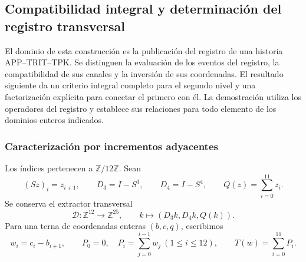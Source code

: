 \subsection{Compatibilidad integral y determinación del registro transversal}
\label{x_reciprocidad:img09:seccion}

El dominio de esta construcción es la publicación del registro de una
historia APP--TRIT--TPK. Se distinguen la evaluación de los eventos del
registro, la compatibilidad de sus canales y la inversión de sus
coordenadas. El resultado siguiente da un criterio integral completo para
el segundo nivel y una factorización explícita para conectar el primero con él.
La demostración utiliza los operadores del registro y establece sus
relaciones para todo elemento de los dominios enteros indicados.

\subsubsection{Caracterización por incrementos adyacentes}

Los índices pertenecen a $\mathbb Z/12\mathbb Z$. Sean
\[
 (Sz)_i=z_{i+1},\qquad D_3=I-S^3,\qquad D_4=I-S^4,
 \qquad Q(z)=\sum_{i=0}^{11}z_i.
\]
Se conserva el extractor transversal
\[
 \mathcal D:\mathbb Z^{12}\longrightarrow\mathbb Z^{25},
 \qquad k\longmapsto(D_3k,D_4k,Q(k)).
\]
Para una terna de coordenadas enteras $(b,c,q)$, escribimos
\begin{equation}
 w_i=c_i-b_{i+1},\qquad
 P_0=0,\quad P_i=\sum_{j=0}^{i-1}w_j\ (1\leq i\leq12),
 \qquad T(w)=\sum_{i=0}^{11}P_i.
 \label{x_reciprocidad:img09:incremento}
\end{equation}

